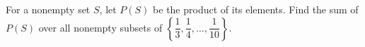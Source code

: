 For a nonempty set $S$, let $P(S)$ be the product of its elements. Find the sum of $P(S)$ over all nonempty subsets of $\left\{\dfrac{1}{3},\dfrac{1}{4},\ldots,\dfrac{1}{10}\right\}$.
